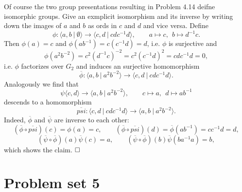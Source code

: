 \documentclass[11pt]{book}
\numberwithin{dummy}{section}
\theoremstyle{nonumberbreak}
\newenvironment{sol}[1][]{\ifthenelse{\equal{#1}{}}{\solution}{\solution[#1]}\rm}{\endsolution}
\newenvironment{prob}[1][]{\ifthenelse{\equal{#1}{}}{\problem}{\problem[#1]}\rm}{\endproblem}
\newcommand{\la}{\longrightarrow}
\begin{document}
\begin{spacing}{1.4}
\begin{prob} %
Of course the two group presentations resulting in Problem 4.14 deifne isomorphic groups. Give an exmplicit isomorphism and its inverse by writing down the images of $a$ and $b$ as ords in $c$ and $d$ and vice versa.
\begin{sol}
Define 
$$\phi: \langle a,b \ \vert \ \emptyset \rangle \la \langle c,d \ \vert \ cdc^{-1}d \rangle, \qquad a \mapsto c, \ \ b \mapsto d^{-1}c.$$
Then $\phi(a)=c$ and $\phi(ab^{-1}) =c (c^{-1}d) = d$, i.e. $\phi$ is surjective and 
$$\phi(a^2b^{-2}) = c^2 \left(d^{-1}c\right)^{-2} = c^2 (c^{-1}d)^2 = cdc^{-1}d = 0,$$
i.e. $\phi$ factorizes over $G_2$ and induces an surjective homomorphism
$$\overline{\phi}: \langle a,b \ \vert \ a^2b^{-2} \rangle \la \langle c,d \ \vert \ cdc^{-1}d \rangle.$$
Analogously we find that 
$$\psi \langle c,d \rangle \la \langle a,b \ \vert \ a^2b^{-2} \rangle, \qquad c \mapsto a, \ \ d \mapsto ab^{-1}$$
descends to a homomorphism 
$$\overline{psi}: \langle c,d \ \vert \ cdc^{-1}d \rangle \la \langle a,b \ \vert \ a^2b^{-2} \rangle.$$
Indeed, $\overline{\phi}$ and $\overline{\psi}$ are inverse to each other:
$$(\overline{\phi} \circ \overline{psi})(c) = \phi(a) = c, \qquad  (\overline{\phi} \circ \overline{psi})(d) = \overline{\phi}(ab^{-1}) = cc^{-1}d = d,$$
$$(\overline{\psi} \circ \overline{\phi})(a) \overline{\psi}(c) = a, \qquad (\overline{\psi} \circ \overline{\phi})(b) \overline{\psi}(ba^{-1}a) = b,$$
which shows the claim. $\hfill\Box$
\end{sol}
\end{prob}





















\newpage

\titlespacing*{\section}{-16.5pt}{0pt}{20pt}
\renewcommand*\thesection{}
\section{Problem set 5} %
\renewcommand*\thesection{\arabic{section}}





\end{spacing}
\end{document}
